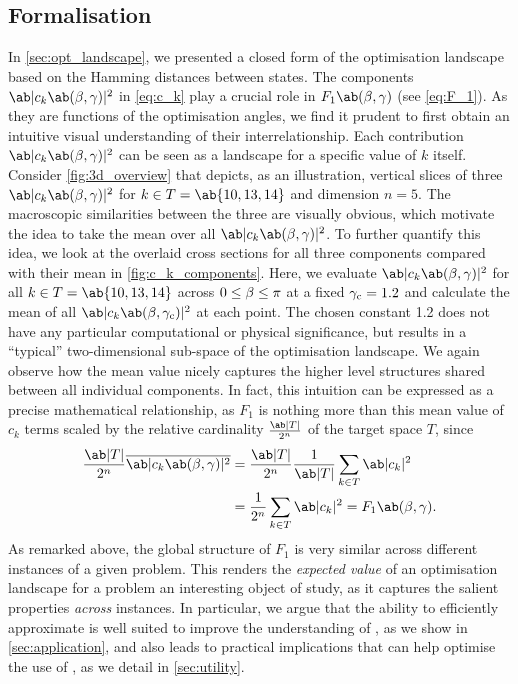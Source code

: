 \subsection{Formalisation}
In \cref{sec:opt_landscape}, we presented a closed form of the optimisation landscape based on the Hamming distances between states. 
The components $\ab|c_k\ab(\mangle,\pangle)|^2$ in \cref{eq:c_k} play a crucial role
in $F_1\ab(\mangle, \pangle)$ (see \cref{eq:F_1}). As they are functions of the optimisation angles, we find it prudent to first obtain an intuitive visual understanding of their 
interrelationship. Each contribution $\ab|c_k\ab(\mangle,\pangle)|^2$ can be seen as a landscape for a specific value of \(k\) itself. Consider \cref{fig:3d_overview} that depicts, as an illustration, vertical slices of three $\ab|c_k\ab(\mangle,\pangle)|^2$ for $k \in T = \ab\{10, 13, 14\}$ and dimension $n = 5$. The macroscopic similarities between the three are visually obvious, which motivate the idea to take the mean over all $\ab|c_k\ab(\mangle,\pangle)|^2$. To further quantify this idea, we look at the overlaid cross sections for all three components compared with their mean in \cref{fig:c_k_components}. Here, we evaluate $\ab|c_k\ab(\mangle,\pangle)|^2$ for all $k \in T = \ab\{10, 13, 14\}$ across $0 \leq \beta \leq \pi$ at a fixed $\gamma_{\text{c}} = 1.2$ and calculate the mean of all $\ab|c_k\ab(\mangle,\pangle_{\text{c}})|^2$ at each point. The chosen constant 1.2 does not have any particular computational or physical significance, but results in a \enquote{typical} two-dimensional sub-space of the optimisation landscape. We again observe how the mean value nicely captures the higher level structures shared between all individual components. In fact, this intuition can be expressed as a precise mathematical relationship, as $F_1$ is nothing more than this mean value of $c_k$ terms scaled by the relative cardinality $\frac{\ab|T|}{2^n}$ of the target space $T$, since
%
\begin{equation}
    \label{eq:F_as_average}
    \begin{aligned}
        \frac{\ab|T|}{2^n} \overline{\ab|c_k\ab(\mangle,\pangle)|^2} &= \frac{\ab|T|}{2^n} \frac{1}{\ab|T|} \sum_{k \in T} \ab|c_k|^2 \\
        &=  \frac{1}{2^n} \sum_{k \in T} \ab|c_k|^2 = F_1\ab(\mangle,\pangle).
    \end{aligned}
\end{equation}
%
As remarked above, the global structure of $F_1$ is very similar across different instances of a given problem. This renders the \emph{expected value} of an optimisation landscape for a problem an interesting object of study, as it captures the salient properties \emph{across} instances. In particular, we argue 
that the ability to efficiently approximate %
is well suited to improve the understanding of \QAOA, as we show in \cref{sec:application},
and also leads to practical implications that can help
optimise the use of \QAOA, as we detail in \cref{sec:utility}.

